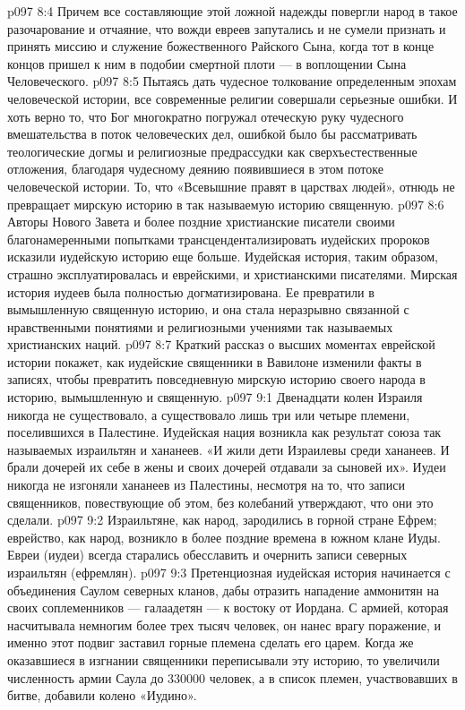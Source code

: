\vs p097 8:4 Причем все составляющие этой ложной надежды повергли народ в такое разочарование и отчаяние, что вожди евреев запутались и не сумели признать и принять миссию и служение божественного Райского Сына, когда тот в конце концов пришел к ним в подобии смертной плоти --- в воплощении Сына Человеческого.
\vs p097 8:5 \pc Пытаясь дать чудесное толкование определенным эпохам человеческой истории, все современные религии совершали серьезные ошибки. И хоть верно то, что Бог многократно погружал отеческую руку чудесного вмешательства в поток человеческих дел, ошибкой было бы рассматривать теологические догмы и религиозные предрассудки как сверхъестественные отложения, благодаря чудесному деянию появившиеся в этом потоке человеческой истории. То, что «Всевышние правят в царствах людей», отнюдь не превращает мирскую историю в так называемую историю священную.
\vs p097 8:6 Авторы Нового Завета и более поздние христианские писатели своими благонамеренными попытками трансцендентализировать иудейских пророков исказили иудейскую историю еще больше. Иудейская история, таким образом, страшно эксплуатировалась и еврейскими, и христианскими писателями. Мирская история иудеев была полностью догматизирована. Ее превратили в вымышленную священную историю, и она стала неразрывно связанной с нравственными понятиями и религиозными учениями так называемых христианских наций.
\vs p097 8:7 \pc Краткий рассказ о высших моментах еврейской истории покажет, как иудейские священники в Вавилоне изменили факты в записях, чтобы превратить повседневную мирскую историю своего народа в историю, вымышленную и священную.
\vs p097 9:1 Двенадцати колен Израиля никогда не существовало, а существовало лишь три или четыре племени, поселившихся в Палестине. Иудейская нация возникла как результат союза так называемых израильтян и хананеев. «И жили дети Израилевы среди хананеев. И брали дочерей их себе в жены и своих дочерей отдавали за сыновей их». Иудеи никогда не изгоняли хананеев из Палестины, несмотря на то, что записи священников, повествующие об этом, без колебаний утверждают, что они это сделали.
\vs p097 9:2 Израильтяне, как народ, зародились в горной стране Ефрем; еврейство, как народ, возникло в более поздние времена в южном клане Иуды. Евреи (иудеи) всегда старались обесславить и очернить записи северных израильтян (ефремлян).
\vs p097 9:3 \pc Претенциозная иудейская история начинается с объединения Саулом северных кланов, дабы отразить нападение аммонитян на своих соплеменников --- галаадетян --- к востоку от Иордана. С армией, которая насчитывала немногим более трех тысяч человек, он нанес врагу поражение, и именно этот подвиг заставил горные племена сделать его царем. Когда же оказавшиеся в изгнании священники переписывали эту историю, то увеличили численность армии Саула до 330000 человек, а в список племен, участвовавших в битве, добавили колено «Иудино».
